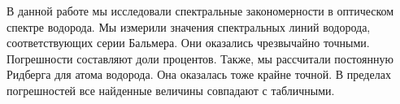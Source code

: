 	
	В данной работе мы исследовали спектральные закономерности в оптическом спектре водорода. Мы измерили значения спектральных линий водорода, соответствующих серии Бальмера. Они оказались чрезвычайно точными. Погрешности составляют доли процентов. Также, мы рассчитали постоянную Ридберга для атома водорода. Она оказалась тоже крайне точной. В пределах погрешностей все найденные величины совпадают с табличными.
	
	
	
	
	
	
	
	
	
	
	
	
